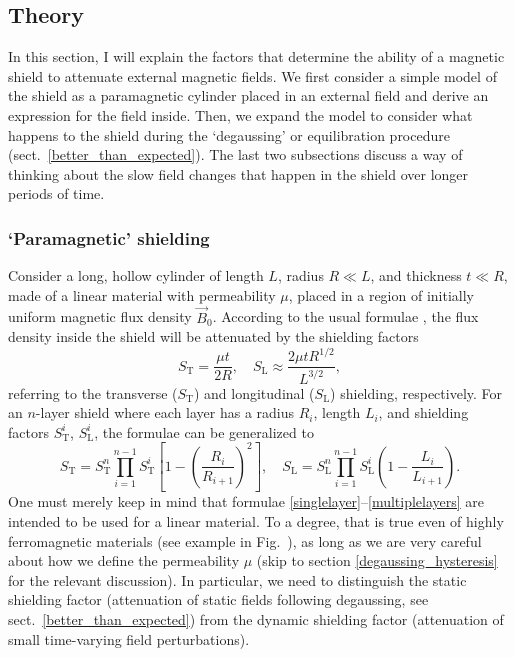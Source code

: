 \subsection{Theory}

In this section, I will explain the factors that determine the ability of a
magnetic shield to attenuate external magnetic fields. We first consider a
simple model of the shield as a paramagnetic cylinder placed in an external
field and derive an expression for the field inside. Then, we expand the model
to consider what happens to the shield during the `degaussing' or equilibration
procedure (sect.~\ref{better_than_expected}). The last two subsections discuss a
way of thinking about the slow field changes that happen in the shield over
longer periods of time.

\subsubsection{`Paramagnetic' shielding}
\label{paramagnetic_shielding}

Consider a long, hollow cylinder of length $L$, radius $R\ll L$, and thickness
$t\ll R$, made of a linear material with permeability $\mu$, placed in a region
of initially uniform magnetic flux density $\vec B_0$. According to the usual
formulae \cite[eqns~3.29--30]{khriplovich2012cp}, the flux density inside the
shield will be attenuated by the shielding factors
%
\begin{equation}
    \label{singlelayer}
S_\text{T}=\frac{\mu t}{2R},
\quad
S_\text{L}\approx\frac{2\mu tR^{1/2}}{L^{3/2}},
\end{equation}
%
referring to the transverse ($S_\text{T}$) and longitudinal ($S_\text{L}$)
shielding, respectively. For an $n$-layer shield where each layer has a radius
$R_i$, length $L_i$, and shielding factors $S_\text{T}^i$, $S_\text{L}^i$, the
formulae can be generalized to \cite[eqns~3.32--33]{khriplovich2012cp}
%
\begin{equation}
    \label{multiplelayers}
S_\text{T}=
S_\text{T}^n\prod_{i=1}^{n-1}S_\text{T}^i
\left[1-\left(\frac{R_i}{R_{i+1}}\right)^2\right],
\quad
S_\text{L}=
S_\text{L}^n\prod_{i=1}^{n-1}S_\text{L}^i
\left(1-\frac{L_i}{L_{i+1}}\right).
\end{equation}
%
One must merely keep in mind that formulae
\ref{singlelayer}--\ref{multiplelayers} are intended to be used for a linear
material. To a degree, that is true even of highly ferromagnetic materials (see
example in Fig.~), as long as we are very careful about how we
define the permeability $\mu$ (skip to section \ref{degaussing_hysteresis} for
the relevant discussion). In particular, we need to distinguish the static
shielding factor (attenuation of static fields following degaussing, see
sect.~\ref{better_than_expected}) from the dynamic shielding factor (attenuation
of small time-varying field perturbations).

